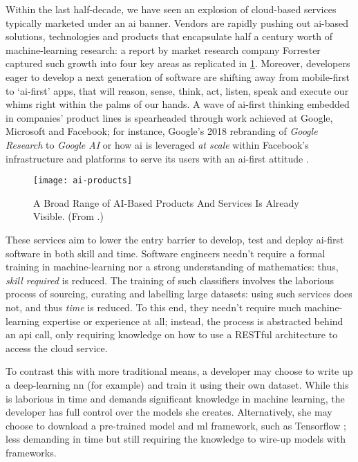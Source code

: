 \label{sec:introduction:preface}

Within the last half-decade, we have seen an explosion of cloud-based services typically marketed under an \gls{ai} banner. 
Vendors are rapidly pushing out \gls{ai}-based solutions, technologies and products that encapsulate half a century worth of machine-learning research: a \citeyear{LoGiudice:2016wf} report by market research company Forrester captured such growth into four key areas \citep{LoGiudice:2016wf} as replicated in  \cref{fig:introduction:ai-products}. 
Moreover, developers eager to develop a next generation of software are shifting away from mobile-first to `\gls{ai}-first' apps, that will reason, sense, think, act, listen, speak and execute our whims right within the palms of our hands. 
A wave of \gls{ai}-first thinking embedded in companies' product lines is spearheaded through work achieved at Google, Microsoft and Facebook; for instance, Google's 2018 rebranding of \textit{Google Research} to \textit{Google AI} \citep{Howard:2018tz} or how \gls{ai} is leveraged \textit{at scale} within Facebook's infrastructure and platforms to serve its users with an \gls{ai}-first attitude \citep{Parekh:2017hx}.

\begin{figure}[p!]
\centering
\caption[Categorisation of AI-based products and services]{A Broad Range of AI-Based Products And Services Is Already Visible. (From \citep{LoGiudice:2016wf}.)}
\label{fig:introduction:ai-products}
\texttt{[image: ai-products]}
\end{figure}

These services aim to lower the entry barrier to develop, test and deploy \gls{ai}-first software in both skill and time. 
Software engineers needn't require a formal training in machine-learning nor a strong understanding of mathematics: thus, \textit{skill required} is reduced. The training of such classifiers involves the laborious process of sourcing, curating and labelling large datasets: using such services does not, and thus \textit{time} is reduced. To this end, they needn't require much machine-learning expertise or experience at all; instead, the process is abstracted behind an \gls{api} call, only requiring knowledge on how to use a RESTful architecture \citep{Fielding:2000vh} to access the cloud service. 

To contrast this with more traditional means, a developer may choose to write up a deep-learning \gls{nn} (for example) and train it using their own dataset. While this is laborious in time and demands significant knowledge in machine learning, the developer has full control over the models she creates. Alternatively, she may choose to download a pre-trained model and \gls{ml} framework, such as Tensorflow \citep{Tensorflow:Whitepaper}; less demanding in time but still requiring the knowledge to wire-up models with frameworks.

